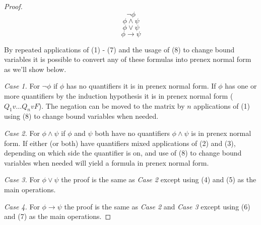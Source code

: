 \documentclass[a4paper,11pt]{article}
\begin{document}
\begin{proof}
		\begin{equation*} \lnot \phi \end{equation*}
		\begin{equation*} \phi \land \psi \end{equation*}
		\begin{equation*} \phi \lor \psi \end{equation*}
		\begin {equation*} \phi \rightarrow \psi \end{equation*}
		
		\smallskip
		
		By repeated applications of (1) - (7) and the usage of (8) to change bound variables 
		it is possible to convert any of these formulas into prenex normal form as we'll show below.
		
		\textit{Case 1.} For $\lnot \phi$ if $\phi$ has no quantifiers it is in prenex normal form. 
		If $\phi$ has one or more quantifiers by the induction hypothesis it is in prenex normal form 
		($Q_{1}v \dots Q_{n}v F$). The negation can be moved to the matrix by $n$ applications 
		of (1) using (8) to change bound variables when needed.
		
		\textit{Case 2.} For $\phi \land \psi$ if $\phi$ and $\psi$ both have no quantifiers $\phi \land \psi$
		is in prenex normal form. If either (or both) have quantifiers mixed applications of (2) and (3), 
		depending on which side the quantifier is on, and use of (8) to change bound variables when needed 
		will yield a formula in prenex normal form.
		
		\textit{Case 3.} For $\phi \lor \psi$ the proof is the same as \textit{Case 2} except using (4) and (5)
		as the main operations.
		
		\textit{Case 4.} For $\phi \rightarrow \psi$ the proof is the same as \textit{Case 2} and \textit{Case 3}
		except using (6) and (7) as the main operations.
		
		
	\end{proof}
	
\end{document}

